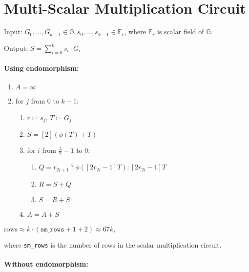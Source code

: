 \section{Multi-Scalar Multiplication Circuit}
\label{section:msm}

Input: $G_0, ..., G_{k - 1} \in \mathbb{G}, s_0, ..., s_{k - 1} \in \mathbb{F}_r$, where $\mathbb{F}_r$ is scalar field of $\mathbb{G}$.


Output: $S = \sum\limits_{i = 0}^{k}s_i \cdot G_i$

\paragraph{Using endomorphism:}

\begin{enumerate}
    \item $A = \infty$
    \item for $j$ from $0$ to $k-1$:
    \begin{enumerate}
        \item $r \coloneqq s_j$, $T \coloneqq G_j$
        \item $S = [2](\phi(T) + T)$
        \item for $i$ from $\frac{\lambda}{2} - 1$ to $0$:
        \begin{enumerate}
            \item $Q = r_{2i + 1} \: ? \: \phi([2r_{2i} - 1]T) : [2r_{2i} - 1]T$
            \item $R = S + Q$
            \item $S = R + S$
        \end{enumerate}
        \item $A = A + S$
    \end{enumerate}
\end{enumerate}

\begin{center}
    $\text{rows} \approx k \cdot (\texttt{sm\_rows} + 1 + 2) \approx 67k$,
\end{center}
where \texttt{sm\_rows} is the number of rows in the scalar multiplication circuit.

\paragraph{Without endomorphism:}

